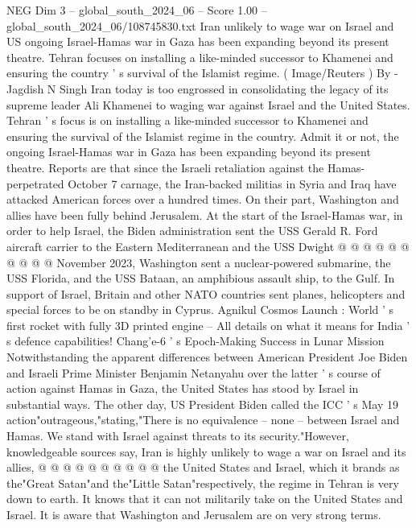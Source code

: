 \begin{textsample}{NEG Dim 3 – global\_south\_2024\_06 – Score 1.00 – global\_south\_2024\_06/108745830.txt}  \label{ex:f3_neg_114}
Iran unlikely to wage war on Israel and US ongoing Israel-Hamas war in Gaza has been expanding beyond its present theatre.
Tehran focuses on installing a like-minded successor to Khamenei and ensuring the country ' s survival of the Islamist regime. ( Image/Reuters ) By -Jagdish N Singh Iran today is too engrossed in consolidating the legacy of its supreme leader Ali Khamenei to waging war against Israel and the United States.
Tehran ' s focus is on installing a like-minded successor to Khamenei and ensuring the survival of the Islamist regime in the country.
Admit it or not, the ongoing Israel-Hamas war in Gaza has been expanding beyond its present theatre.
Reports are that since the Israeli retaliation against the Hamas-perpetrated October 7 carnage, the Iran-backed militias in Syria and Iraq have attacked American forces over a hundred times.
On their part, Washington and allies have been fully behind Jerusalem.
At the start of the Israel-Hamas war, in order to help Israel, the Biden administration sent the USS Gerald R.
Ford aircraft carrier to the Eastern Mediterranean and the USS Dwight @ @ @ @ @ @ @ @ @ @ November 2023, Washington sent a nuclear-powered submarine, the USS Florida, and the USS Bataan, an amphibious assault ship, to the Gulf.
In support of Israel, Britain and other NATO countries sent planes, helicopters and special forces to be on standby in Cyprus.
Agnikul Cosmos Launch : World ' s first rocket with fully 3D printed engine -- All details on what it means for India ' s defence capabilities!
Chang'e-6 ' s Epoch-Making Success in Lunar Mission Notwithstanding the apparent differences between American President Joe Biden and Israeli Prime Minister Benjamin Netanyahu over the latter ' s course of action against Hamas in Gaza, the United States has stood by Israel in substantial ways.
The other day, US President Biden called the ICC ' s May 19 action"outrageous,"stating,"There is no equivalence -- none -- between Israel and Hamas.
We stand with Israel against threats to its security."However, knowledgeable sources say, Iran is highly unlikely to wage a war on Israel and its allies, @ @ @ @ @ @ @ @ @ @ the United States and Israel, which it brands as the"Great Satan"and the"Little Satan"respectively, the regime in Tehran is very down to earth.
It knows that it can not militarily take on the United States and Israel.
It is aware that Washington and Jerusalem are on very strong terms.

\end{textsample}
